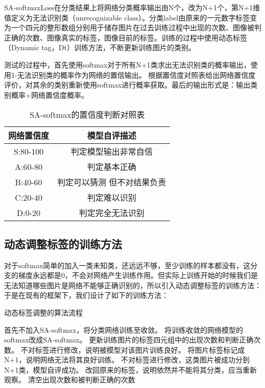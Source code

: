 SA-softmaxLoss在分类结果上将网络分类概率输出由N个，改为N+1个，第N+1维值定义为无法识别类（unrecognizable class）。分类label由原来的一元数字标签变为一个四元的整形数组分别用于储存图片在过去训练过程中出现的次数、图像被判正确的次数、图像真实的标签，图像目前的标签。训练的过程中使用动态标签（Dynamic tag，Dt）训练方法，不断更新训练图片的类别。

测试的过程中，首先使用softmax对于所有N+1类求出无法识别类的概率输出，使用1-无法识别类的概率作为网络的置信输出。
根据置信度对照表给出网络置信度评价，对其余的类别重新使用softmax进行概率获取。最后的输出形式是：输出类别概率+网络置信度概率。
 \begin{table}
  \centering
   \caption{SA-softmax的置信度判断对照表}
   \label{tab:req-pkg}
   \begin{tabular}{c|c}
     \toprule
     网络置信度 & 模型自评描述 \\
     \midrule
     S:80-100 & 判定模型输出非常自信				 	\\
     A:60-80  & 判定基本正确 				 		\\
     B:40-60  & 判定可以猜测 但不对结果负责  	 	\\
     C:20-40  & 判定难以识别    					\\
     D:0-20   & 判定完全无法识别				\\
     \bottomrule
   \end{tabular}
 \end{table}
\subsection{动态调整标签的训练方法}
对于softmax简单的加入一类未知类，还远远不够，至少训练的样本都没有，这分支的梯度永远都是0，不会对网络产生训练作用。但实际上训练开始的时候我们是无法知道哪些图片是网络不能够正确识别的，所以引入动态调整标签的训练方法：
于是在现有的框架下，我们设计了如下的训练方法：

\begin{algorithm}[h]
\caption{动态标签调整的算法流程}
\begin{algorithmic}[1]
\STATE 首先不加入SA-softmax，将分类网络训练至收敛。
\STATE 将训练收敛的网络模型的softmax改成SA-softmax。
\STATE 更新训练图片的标签四元组中的出现次数和判断正确次数。
\ENDFOR
{}
\STATE 不对标签进行修改，说明被模型对该图片训练良好。
\ELSE[准确率低于0.5]
\STATE 将图片标签标记成N+1，说明网络无法将其良好训练。
\ENDIF
\ELSE 
{}
\STATE 不对标签进行修改，这类图片被成功分到N+1类，模型自评成功。
\ELSE [准确率低于0.5]
\STATE 改回原来的标签，说明依然并不能将其分类，应当重新观察。
\ENDIF
\ENDIF
\STATE 清空出现次数和被判断正确的次数
\ENDWHILE
\end{algorithmic}
\end{algorithm}


